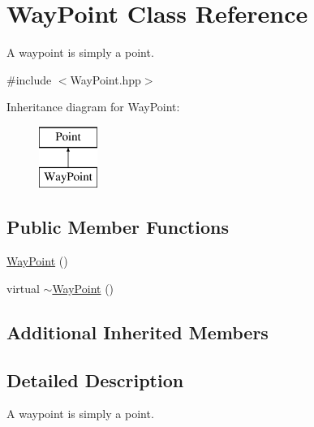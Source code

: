 \hypertarget{classWayPoint}{\section{Way\-Point Class Reference}
\label{classWayPoint}
}


A waypoint is simply a point.  




{\ttfamily \#include $<$Way\-Point.\-hpp$>$}

Inheritance diagram for Way\-Point\-:\begin{figure}[H]
\begin{center}
\leavevmode
\includegraphics[height=2.000000cm]{classWayPoint}
\end{center}
\end{figure}
\subsection*{Public Member Functions}
\begin{DoxyCompactItemize}
\item 
\hyperlink{classWayPoint_a0388a615719454d38b5a8160d8058550}{Way\-Point} ()
\item 
virtual \hyperlink{classWayPoint_acb5d912197e2371772213fe2e1723316}{$\sim$\-Way\-Point} ()
\end{DoxyCompactItemize}
\subsection*{Additional Inherited Members}


\subsection{Detailed Description}
A waypoint is simply a point. 

